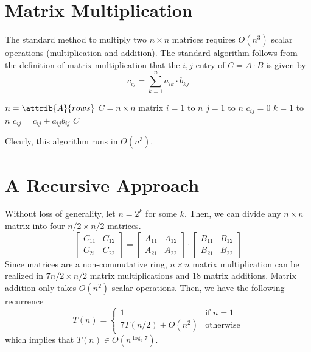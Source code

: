 \section{Matrix Multiplication}

The standard method to multiply two $n \times n$ matrices requires $O(n^3)$ scalar operations (multiplication and addition). The standard algorithm follows from the definition of matrix multiplication that the $i,j$ entry of $C=A \cdot B$ is given by
$$
c_{ij} = \sum_{k=1}^n a_{ik} \cdot b_{kj}
$$
\begin{codebox}
    \li $n = \attrib{A}{rows}$
    \li $C = \text{$n \times n$ matrix}$
    \li \For $i=1$ to $n$ \Do
        \li \For $j=1$ to $n$ \Do
            \li $c_{ij} = 0$
            \li \For $k=1$ to $n$ \Do
                \li $c_{ij} = c_{ij} + a_{ij}b_{ij}$
            \End
        \End
    \End
    \li \Return $C$ 
\end{codebox}
Clearly, this algorithm runs in $\Theta(n^3)$. 

\section{A Recursive Approach}

Without loss of generality, let $n=2^k$ for some $k$. Then, we can divide any $n \times n$ matrix into four $n/2 \times n/2$ matrices.
$$
\begin{bmatrix} C_{11} & C_{12} \\ C_{21} & C_{22} \end{bmatrix} = \begin{bmatrix} A_{11} & A_{12} \\ A_{21} & A_{22} \end{bmatrix}  \cdot \begin{bmatrix} B_{11} & B_{12} \\ B_{21} & B_{22} \end{bmatrix} 
$$
Since matrices are a non-commutative ring, $n \times n$ matrix multiplication can be realized in $7 n/2 \times n/2$ matrix multiplications and 18 matrix additions. Matrix addition only takes $O(n^2)$ scalar operations. Then, we have the following recurrence
$$
T(n) =
\begin{cases}
    1 & \text{if $n = 1$} \\
    7 T(n/2) + O(n^2) & \text{otherwise}
\end{cases}
$$
which implies that $T(n) \in O(n^{\log_2 7})$.

